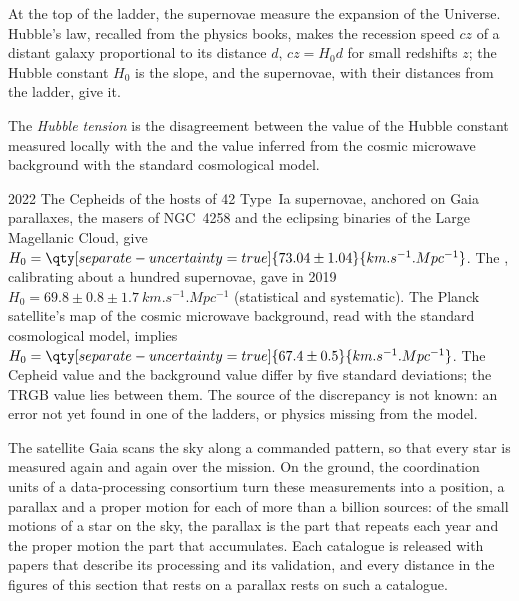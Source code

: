 At the top of the ladder, the supernovae measure the expansion of the
Universe. Hubble's law, recalled from the physics books, makes the
recession speed $cz$ of a distant galaxy proportional to its distance $d$,
$cz = H_0 d$ for small redshifts $z$; the Hubble constant $H_0$ is the
slope, and the supernovae, with their distances from the ladder, give it.

\begin{definition}\label{def:b3:milky-way-galaxies:tension}
The \emph{Hubble tension} is the disagreement
between the value of the Hubble constant measured locally with the
 and the value inferred from the cosmic microwave
background with the standard cosmological model.
\end{definition}

\begin{dated}{2022}
The Cepheids of the hosts of 42 Type~Ia supernovae, anchored on Gaia
parallaxes, the masers of NGC~4258 and the eclipsing binaries of the
Large Magellanic Cloud, give
$H_0 = \qty[separate-uncertainty=true]{73.04 \pm 1.04}{km.s^{-1}.Mpc^{-1}}$.
The , calibrating about a hundred supernovae,
gave in 2019 $H_0 = 69.8 \pm 0.8 \pm \qty{1.7}{km.s^{-1}.Mpc^{-1}}$
(statistical and systematic). The Planck satellite's map of the cosmic
microwave background, read with the standard cosmological model, implies
$H_0 = \qty[separate-uncertainty=true]{67.4 \pm 0.5}{km.s^{-1}.Mpc^{-1}}$.
The Cepheid value and the background value differ by five standard
deviations; the TRGB value lies between them. The source of the
discrepancy is not known: an error not yet found in one of the ladders,
or physics missing from the model.
\end{dated}

\begin{inthelab}
The satellite Gaia scans the sky along a commanded pattern, so that every
star is measured again and again over the mission. On the ground, the
coordination units of a data-processing consortium turn these
measurements into a position, a parallax and a proper motion for each of
more than a billion sources: of the small motions of a star on the sky,
the parallax is the part that repeats each year and the proper motion
the part that accumulates. Each catalogue is released with papers that
describe its processing and its validation, and every distance in the
figures of this section that rests on a parallax rests on such a
catalogue.
\end{inthelab}

